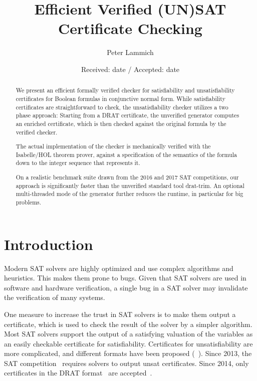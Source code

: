 \documentclass[smallcondensed]{svjour3}     %
\begin{document}
\title{Efficient Verified (UN)SAT Certificate Checking}

\author{Peter Lammich}


\date{Received: date / Accepted: date}

\maketitle

\begin{abstract}
We present an efficient formally verified checker for satisfiability and unsatisfiability certificates for 
Boolean formulas in conjunctive normal form. 
While satisfiability certificates are straightforward to check, the unsatisfiability checker utilizes a two phase approach: 
Starting from a DRAT certificate, the unverified generator computes an enriched certificate,
which is then checked against the original formula by the verified checker.

The actual implementation of the checker is mechanically verified with the Isabelle/HOL theorem prover, 
against a specification of the semantics of the formula down to the integer sequence that represents it.

On a realistic benchmark suite drawn from the 2016 and 2017 SAT competitions, our approach is significantly faster 
than the unverified standard tool drat-trim. An optional multi-threaded mode of the generator further reduces the 
runtime, in particular for big problems.
\end{abstract}




\section{Introduction}
Modern SAT solvers are highly optimized and use complex algorithms and heuristics. This makes them prone to bugs.
Given that SAT solvers are used in software and hardware verification, a single bug in a SAT solver may 
invalidate the verification of many systems.

One measure to increase the trust in SAT solvers is to make them output a certificate, which is used to check 
the result of the solver by a simpler algorithm. 
Most SAT solvers support the output of a satisfying valuation of the variables as an easily checkable certificate for satisfiability.
Certificates for unsatisfiability are more complicated, and different formats have been proposed (\eg~\cite{SiBi06,WHH13,WHH14}).
Since 2013, the SAT competition~\cite{satcomp-2013} requires solvers to output unsat certificates.
Since 2014, only certificates in the DRAT format~\cite{WHH14} are accepted~\cite{satcomp-2014}.
\end{document}

